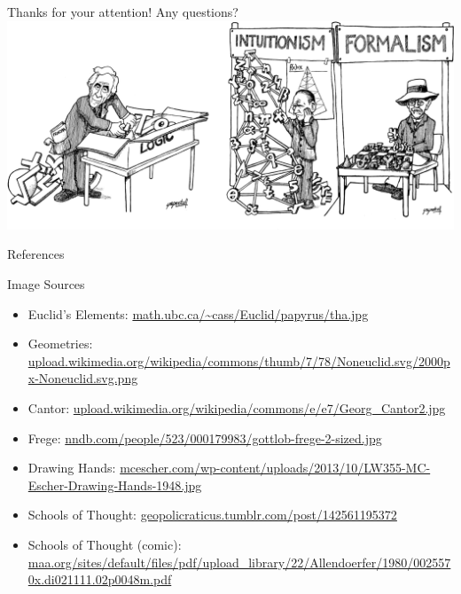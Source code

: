 \documentclass{beamer}
\begin{document}
\begin{frame}
	\center
	\Large{Thanks for your attention! Any questions?}
	\vspace{0.5\baselineskip}\\
	\includegraphics[height=0.6\textheight]{img/logic_intuit_form2.png}
\end{frame}
\begin{frame}[allowframebreaks]{References}
  
  
\end{frame}

\begin{frame}[allowframebreaks]{Image Sources}
\begin{itemize}
\item Euclid's Elements: \url{math.ubc.ca/~cass/Euclid/papyrus/tha.jpg}
\item Geometries: \url{upload.wikimedia.org/wikipedia/commons/thumb/7/78/Noneuclid.svg/2000px-Noneuclid.svg.png}
\item Cantor: \url{upload.wikimedia.org/wikipedia/commons/e/e7/Georg_Cantor2.jpg}
\item Frege: \url{nndb.com/people/523/000179983/gottlob-frege-2-sized.jpg}
\item Drawing Hands: \url{mcescher.com/wp-content/uploads/2013/10/LW355-MC-Escher-Drawing-Hands-1948.jpg}
\item Schools of Thought: \url{geopolicraticus.tumblr.com/post/142561195372}
\item Schools of Thought (comic): \url{maa.org/sites/default/files/pdf/upload\_library/22/Allendoerfer/1980/0025570x.di021111.02p0048m.pdf}
\end{itemize}
\end{frame}
\end{document}
